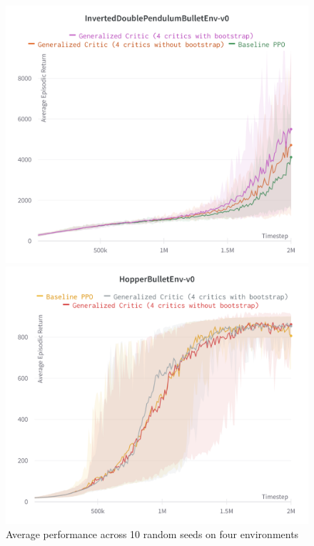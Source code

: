 \begin{figure}[!htb]
\begin{minipage}[b]{.5\linewidth}
  \centering
  \centerline{\includegraphics[width=\linewidth]{images/inverteddoublependulum}}
\end{minipage}
\begin{minipage}[b]{.5\linewidth}
  \centering
  \centerline{\includegraphics[width=\linewidth]{images/hopper}}
\end{minipage}
\caption{Average performance across 10 random seeds on four environments}
\label{exp2}
\end{figure}
